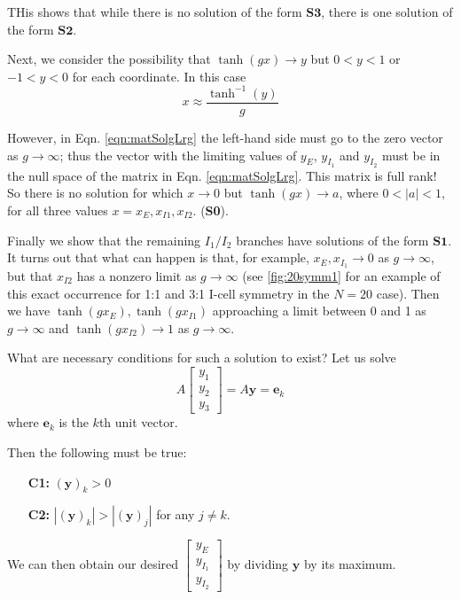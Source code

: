\documentclass[11pt,reqno]{amsart}
\begin{document}
        THis shows that while there is no solution of the form $\textbf{S3}$, there is one solution of the form $\textbf{S2}$.
 
Next, we consider the possibility that 
 $\tanh(gx) \rightarrow y$ but $0 < y < 1$ or $-1 < y < 0$ for each coordinate. In this case 
\[ x \approx \frac{\tanh^{-1}(y)}{g} \]

However, in Eqn. \eqref{eqn:matSolgLrg} the left-hand side must go to the zero vector as $g \rightarrow \infty$; thus the vector with the limiting values of $y_E$, $y_{I_1}$ and $y_{I_2}$ must be in the null space of the matrix in Eqn. \eqref{eqn:matSolgLrg}. 
This matrix is full rank! So there is no solution for which $x \rightarrow 0$ but $\tanh(gx) \rightarrow a$, where $0 < |a| < 1$, for all three values $x = x_E, x_{I1}, x_{I2}$. (\textbf{S0}).

Finally we show that the remaining $I_1/I_2$ branches have solutions of the form $\textbf{S1}$.
It turns out that what can happen is that, for example, $x_{E}, x_{I_1} \rightarrow 0$ as $g \rightarrow \infty$, but that $x_{I2}$ has a nonzero limit as $g \rightarrow \infty$ (see \cref{fig:20symm1} for an example of this exact occurrence for 1:1 and 3:1 I-cell symmetry in the $N=20$ case). Then we have $\tanh(g x_E), \tanh(g x_{I1})$ approaching a limit between 0 and 1 as $g \rightarrow \infty$ and $\tanh(g x_{I2}) \rightarrow 1$ as $g \rightarrow \infty$.

What are necessary conditions for such a solution to exist? Let us solve
\[ A \begin{bmatrix} y_1\\y_2\\y_3\end{bmatrix} = A \textbf{y} = \textbf{e}_k 
\]
where $\textbf{e}_k$ is the $k$th unit vector.

Then the following must be true:
\begin{enumerate}
    \item[\textbf{C1:}] $(\textbf{y})_k > 0$
    \item[\textbf{C2:}] $|(\textbf{y})_k| > |(\textbf{y})_j|$ for any $j\not=k$. 
\end{enumerate}
We can then obtain our desired $\begin{bmatrix} y_E\\y_{I_1}\\y_{I_2}\end{bmatrix} $ by dividing $\textbf{y}$ by its maximum.

\end{document}

